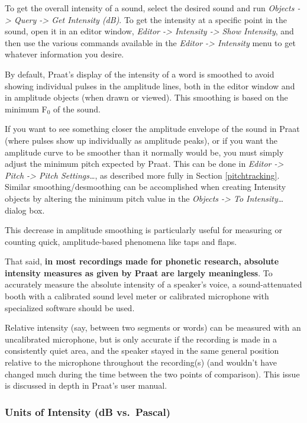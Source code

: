 To get the overall intensity of a sound, select the desired sound and
run \emph{Objects -\textgreater{} Query -\textgreater{} Get Intensity
(dB)}. To get the intensity at a specific point in the sound, open it in
an editor window, \emph{Editor -\textgreater{} Intensity -\textgreater{}
Show Intensity}, and then use the various commands available in the
\emph{Editor -\textgreater{} Intensity} menu to get whatever information
you desire.

By default, Praat's display of the intensity of a word is smoothed to
avoid showing individual pulses in the amplitude lines, both in the
editor window and in amplitude objects (when drawn or viewed). This
smoothing is based on the minimum F$_{0}$ of the sound.

If you want to see something closer the amplitude envelope of the sound
in Praat (where pulses show up individually as amplitude peaks), or if
you want the amplitude curve to be smoother than it normally would be,
you must simply adjust the minimum pitch expected by Praat. This can be
done in \emph{Editor -\textgreater{} Pitch -\textgreater{} Pitch
Settings\ldots{}}, as described more fully in Section
\ref{pitchtracking}. Similar smoothing/desmoothing can be accomplished
when creating Intensity objects by altering the minimum pitch value in
the \emph{Objects -\textgreater{} To Intensity\ldots{}} dialog box.

This decrease in amplitude smoothing is particularly useful for
measuring or counting quick, amplitude-based phenomena like taps and
flaps.

That said, \textbf{in most recordings made for phonetic research,
absolute intensity measures as given by Praat are largely meaningless}.
To accurately measure the absolute intensity of a speaker's voice, a
sound-attenuated booth with a calibrated sound level meter or calibrated
microphone with specialized software should be used.

Relative intensity (say, between two segments or words) can be measured
with an uncalibrated microphone, but is only accurate if the recording
is made in a consistently quiet area, and the speaker stayed in the same
general position relative to the microphone throughout the recording(s)
(and wouldn't have changed much during the time between the two points
of comparison). This issue is discussed in depth in Praat's user manual.

\hypertarget{units-of-intensity-db-vs.-pascal}{%
\subsubsection{Units of Intensity (dB
vs.~Pascal)}\label{units-of-intensity-db-vs.-pascal}}

